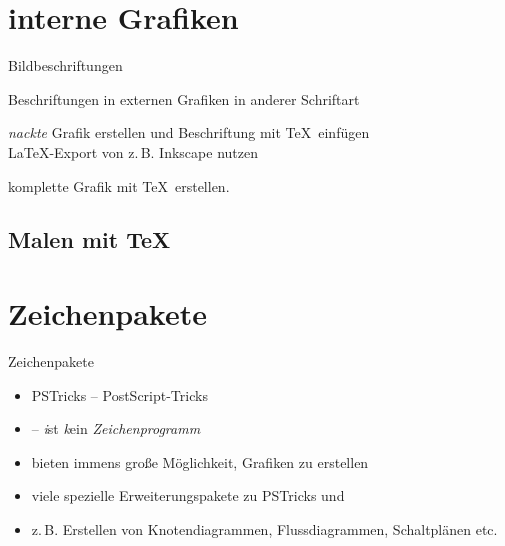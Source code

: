 \documentclass[
	vorläufig=true,
	datum=2017-11-24,
	titel={Grafiken, Abbildungen, TikZ},
	web=true,
	mo,
]{../tex/latexkurs-slides}
\begin{document}

\section{interne Grafiken}
\begin{frame}{Bildbeschriftungen}
\begin{description}
\item<+->[Problem] Beschriftungen in externen Grafiken in anderer Schriftart
\item<+->[Lösung] \emph{nackte} Grafik erstellen und Beschriftung mit \TeX\ einfügen\\\LaTeX-Export von z.\,B.  Inkscape nutzen
\item<+->[Lösung] komplette Grafik mit \TeX\ erstellen.
\end{description}
\end{frame}

\subsection{Malen mit \TeX}

\section{Zeichenpakete}
\begin{frame}[fragile]{Zeichenpakete}
	\begin{itemize}
		\item PSTricks – PostScript-Tricks 
		\item \TikZ – \TikZ \emph{i}st \emph{k}ein \emph{Zeichenprogramm}
		\item bieten immens große Möglichkeit, Grafiken zu erstellen
		\item viele spezielle Erweiterungspakete zu PSTricks und \TikZ
		\item z.\,B. Erstellen von Knotendiagrammen, Flussdiagrammen, Schaltplänen etc. 
	\end{itemize}
\end{frame}
\end{document}
